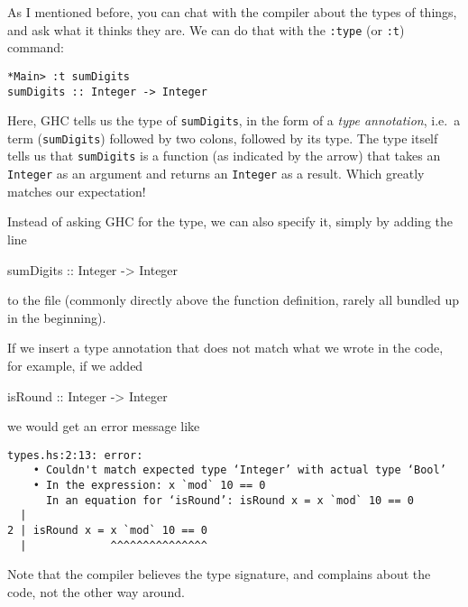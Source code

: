 \documentclass[11pt,
  american,
  DIV13]{article}
\newenvironment{Shaded}{}{}
\newcommand{\DataTypeTok}[1]{\textcolor[rgb]{0.56,0.13,0.00}{#1}}
\newcommand{\OtherTok}[1]{\textcolor[rgb]{0.00,0.44,0.13}{#1}}
\begin{document}
As I mentioned before, you can chat with the compiler about the types of
things, and ask what it thinks they are. We can do that with the
\texttt{:type} (or \texttt{:t}) command:

\begin{verbatim}
*Main> :t sumDigits
sumDigits :: Integer -> Integer
\end{verbatim}

Here, GHC tells us the type of \texttt{sumDigits}, in the form of a
\emph{type annotation}, i.e.~a term (\texttt{sumDigits}) followed by two
colons, followed by its type. The type itself tells us that
\texttt{sumDigits} is a function (as indicated by the arrow) that takes
an \texttt{Integer} as an argument and returns an \texttt{Integer} as a
result. Which greatly matches our expectation!

Instead of asking GHC for the type, we can also specify it, simply by
adding the line

\begin{Shaded}
\begin{Highlighting}[]
\OtherTok{sumDigits ::} \DataTypeTok{Integer} \OtherTok{{-}\textgreater{}} \DataTypeTok{Integer}
\end{Highlighting}
\end{Shaded}

to the file (commonly directly above the function definition, rarely all
bundled up in the beginning).

If we insert a type annotation that does not match what we wrote in the
code, for example, if we added

\begin{Shaded}
\begin{Highlighting}[]
\OtherTok{isRound ::} \DataTypeTok{Integer} \OtherTok{{-}\textgreater{}} \DataTypeTok{Integer}
\end{Highlighting}
\end{Shaded}

we would get an error message like

\begin{verbatim}
types.hs:2:13: error:
    • Couldn't match expected type ‘Integer’ with actual type ‘Bool’
    • In the expression: x `mod` 10 == 0
      In an equation for ‘isRound’: isRound x = x `mod` 10 == 0
  |
2 | isRound x = x `mod` 10 == 0
  |             ^^^^^^^^^^^^^^^
\end{verbatim}

Note that the compiler believes the type signature, and complains about
the code, not the other way around.
\end{document}

